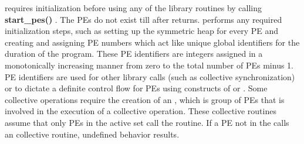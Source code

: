 \openshmem requires initialization before using any of the \openshmem library
routines by calling \textbf{start\_pes()} .%
The \ac{PE}s do not exist till after  returns.  performs any required initialization steps, such as setting up the symmetric heap for every \ac{PE} and creating and assigning \ac{PE} numbers which act like unique global identifiers for the duration of the program. These \ac{PE} identifiers are integers assigned in a monotonically increasing manner from zero to the total number of \ac{PE}s minus 1. \ac{PE} identifiers are used for other \openshmem library calls (such as collective synchronization) or to dictate a definite control flow for \ac{PE}s using constructs of \Clang{} or \Fortran. Some collective operations require the creation of an \activeset, which is  group of \ac{PE}s that is involved in the execution of a collective operation. These collective routines assume that only \ac{PE}s in the active set call the routine. If a \ac{PE} not in the \activeset{} calls an \openshmem{} collective routine, undefined  behavior results.

